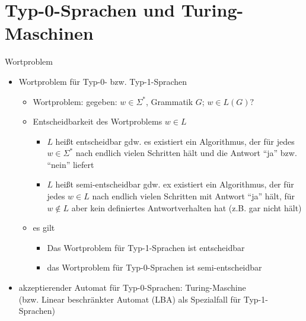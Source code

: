 \section{Typ-0-Sprachen und Turing-Maschinen}

\begin{frame}{Wortproblem}
	\begin{itemize}
		\item Wortproblem für Typ-0- bzw. Typ-1-Sprachen
		\begin{itemize}
			\item Wortproblem: gegeben: $w \in \Sigma^*$, Grammatik $G$; $w \in L(G)?$
			\item Entscheidbarkeit des Wortproblems $w \in L$
			\begin{itemize}
				\item $L$ heißt entscheidbar gdw. es existiert ein Algorithmus, der für jedes $w \in \Sigma^*$ nach endlich vielen Schritten hält und die Antwort "`ja"' bzw. "`nein"' liefert
				\item $L$ heißt semi-entscheidbar gdw. ex existiert ein Algorithmus, der für jedes $w \in L$ nach endlich vielen Schritten mit Antwort "`ja"' hält, für $w \notin L$ aber kein definiertes Antwortverhalten hat (z.B. gar nicht hält)
			\end{itemize}
			\item es gilt
			\begin{itemize}
				\item Das Wortproblem für Typ-1-Sprachen ist entscheidbar
				\item das Wortproblem für Typ-0-Sprachen ist semi-entscheidbar
			\end{itemize}
		\end{itemize}
		\item akzeptierender Automat für Typ-0-Sprachen: Turing-Maschine\\
		(bzw. Linear beschränkter Automat (LBA) als Spezialfall für Typ-1-Sprachen)
	\end{itemize}
\end{frame}

